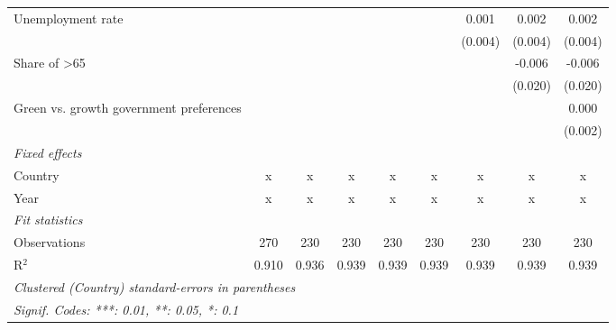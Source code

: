 \begin{table}[htbp]
\begin{tabular}{lcccccccc}
      Unemployment rate                       &         &         &               &               &               & 0.001         & 0.002         & 0.002\\   
                                              &         &         &               &               &               & (0.004)       & (0.004)       & (0.004)\\   
      Share of >65                            &         &         &               &               &               &               & -0.006        & -0.006\\   
                                              &         &         &               &               &               &               & (0.020)       & (0.020)\\   
      Green vs. growth government preferences &         &         &               &               &               &               &               & 0.000\\   
                                              &         &         &               &               &               &               &               & (0.002)\\   
      \emph{Fixed effects}\\
      Country                                 & x       & x       & x             & x             & x             & x             & x             & x\\  
      Year                                    & x       & x       & x             & x             & x             & x             & x             & x\\  
      \midrule \emph{Fit statistics}\\
      Observations                            & 270     & 230     & 230           & 230           & 230           & 230           & 230           & 230\\  
      R$^2$                                   & 0.910   & 0.936   & 0.939         & 0.939         & 0.939         & 0.939         & 0.939         & 0.939\\  
      \midrule
      \multicolumn{9}{l}{\emph{Clustered (Country) standard-errors in parentheses}}\\
      \multicolumn{9}{l}{\emph{Signif. Codes: ***: 0.01, **: 0.05, *: 0.1}}\\
   \end{tabular}
\end{table}


